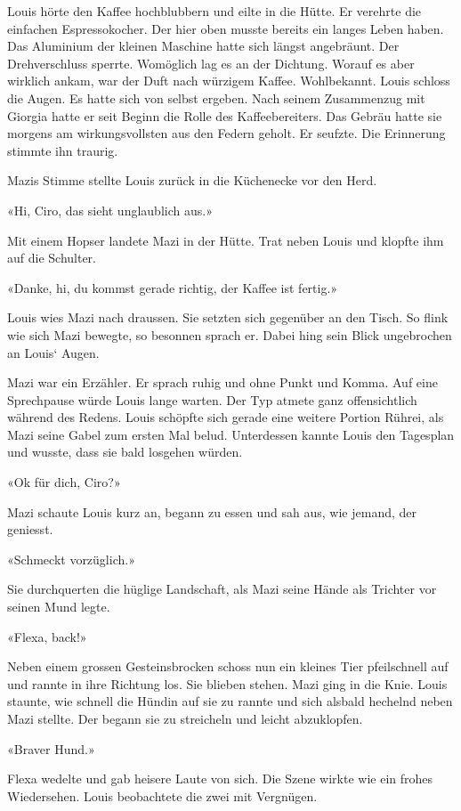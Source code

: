 Louis hörte den Kaffee hochblubbern und eilte in die Hütte. Er verehrte
die einfachen Espressokocher. Der hier oben musste bereits ein langes
Leben haben. Das Aluminium der kleinen Maschine hatte sich längst
angebräunt. Der Drehverschluss sperrte. Womöglich lag es an der
Dichtung. Worauf es aber wirklich ankam, war der Duft nach würzigem
Kaffee. Wohlbekannt. Louis schloss die Augen. Es hatte sich von selbst
ergeben. Nach seinem Zusammenzug mit Giorgia hatte er seit Beginn die
Rolle des Kaffeebereiters. Das Gebräu hatte sie morgens am
wirkungsvollsten aus den Federn geholt. Er seufzte. Die Erinnerung
stimmte ihn traurig.

Mazis Stimme stellte Louis zurück in die Küchenecke vor den Herd.

«Hi, Ciro, das sieht unglaublich aus.»

Mit einem Hopser landete Mazi in der Hütte. Trat neben Louis und klopfte
ihm auf die Schulter.

«Danke, hi, du kommst gerade richtig, der Kaffee ist fertig.»

Louis wies Mazi nach draussen. Sie setzten sich gegenüber an den Tisch.
So flink wie sich Mazi bewegte, so besonnen sprach er. Dabei hing sein
Blick ungebrochen an Louis` Augen.

Mazi war ein Erzähler. Er sprach ruhig und ohne Punkt und Komma. Auf
eine Sprechpause würde Louis lange warten. Der Typ atmete ganz
offensichtlich während des Redens. Louis schöpfte sich gerade eine
weitere Portion Rührei, als Mazi seine Gabel zum ersten Mal belud.
Unterdessen kannte Louis den Tagesplan und wusste, dass sie bald
losgehen würden.

«Ok für dich, Ciro?»

Mazi schaute Louis kurz an, begann zu essen und sah aus, wie jemand, der
geniesst.

«Schmeckt vorzüglich.»

Sie durchquerten die hüglige Landschaft, als Mazi seine Hände als
Trichter vor seinen Mund legte.

«Flexa, back!»

Neben einem grossen Gesteinsbrocken schoss nun ein kleines Tier
pfeilschnell auf und rannte in ihre Richtung los. Sie blieben stehen.
Mazi ging in die Knie. Louis staunte, wie schnell die Hündin auf sie zu
rannte und sich alsbald hechelnd neben Mazi stellte. Der begann sie zu
streicheln und leicht abzuklopfen.

«Braver Hund.»

Flexa wedelte und gab heisere Laute von sich. Die Szene wirkte wie ein
frohes Wiedersehen. Louis beobachtete die zwei mit Vergnügen.

